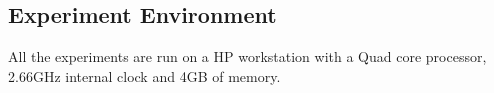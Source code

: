 \documentclass[10pt,journal,compsoc]{IEEEtran}
\begin{document}
 

\subsection{Experiment Environment}
All the experiments are run on a HP workstation with a Quad core processor, 2.66GHz internal clock and 4GB of memory.  
\end{document}
